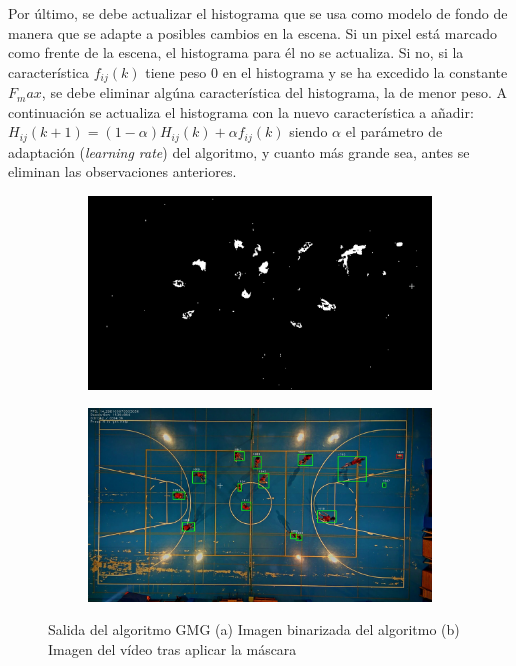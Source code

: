 Por último, se debe actualizar el histograma que se usa como modelo de fondo de manera que se adapte a posibles cambios en la escena. Si un pixel está marcado como frente de la escena, el histograma para él no se actualiza. Si no, si la característica $f_{ij}(k)$ tiene peso 0 en el histograma y se ha excedido la constante $F_max$, se debe eliminar algúna característica del histograma, la de menor peso. A continuación se actualiza el histograma con la nuevo característica a añadir: $H_{ij}(k+1)=(1-\alpha)H_{ij}(k)+\alpha f_{ij}(k)$ siendo $\alpha$ el parámetro de adaptación (\textit{learning rate}) del algoritmo, y cuanto más grande sea, antes se eliminan las observaciones anteriores.

\begin{figure}
\begin{subfigure}{.5\textwidth}
  \centering
  \includegraphics[width=.9\linewidth]{images/GMGsub}
  \caption { }
  \label{fig:GMG1a}
\end{subfigure}%
\begin{subfigure}{.5\textwidth}
  \centering
  \includegraphics[width=.9\linewidth]{images/GMG}
  \caption { }
  \label{fig:GMG1b}
\end{subfigure}
\caption{Salida del algoritmo GMG (a) Imagen binarizada del algoritmo (b) Imagen del vídeo tras aplicar la máscara }
\label{fig:GMG}
\end{figure}

